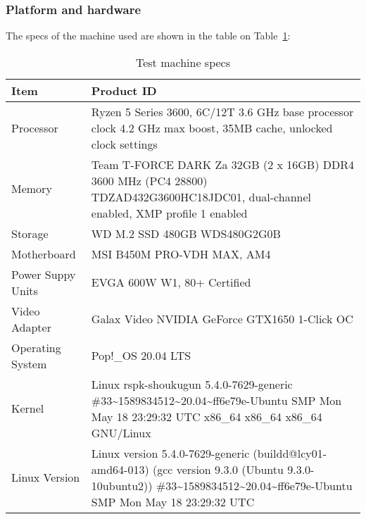 \subsubsection{Platform and hardware}
The specs of the machine used are shown in the table on Table~\ref{TABLE:SPECS}:\\

\begin{table}[!ht]
    \centering
    \begin{tabularx}{\linewidth}{|l|X|}
        \hline
        Item & Product ID \\
        \hline
        Processor  & Ryzen 5 Series 3600, 6C/12T 3.6 GHz base processor clock 4.2 GHz max boost, 35MB cache, unlocked clock settings \\
        \hline
        Memory  & Team T-FORCE DARK Za 32GB (2 x 16GB) DDR4 3600 MHz (PC4 28800) TDZAD432G3600HC18JDC01, dual-channel enabled, XMP profile 1 enabled\\
        \hline
        Storage  & WD M.2 SSD 480GB WDS480G2G0B \\
        \hline
        Motherboard  & MSI B450M PRO-VDH MAX, AM4 \\
        \hline
        Power Suppy Units  & EVGA 600W W1, 80+ Certified\\
        \hline
        Video Adapter  &  Galax Video NVIDIA GeForce GTX1650 1-Click OC  \\
        \hline
        Operating System  &  Pop!\_OS 20.04 LTS  \\
        \hline
        Kernel  &  Linux rspk-shoukugun 5.4.0-7629-generic \#33\~{}1589834512\~{}20.04\~{}ff6e79e-Ubuntu SMP Mon May 18 23:29:32 UTC  x86\_64 x86\_64 x86\_64 GNU/Linux\\
        \hline
        Linux Version  & Linux version 5.4.0-7629-generic (buildd@lcy01-amd64-013) (gcc version 9.3.0 (Ubuntu 9.3.0-10ubuntu2)) \#33\~{}1589834512\~{}20.04\~{}ff6e79e-Ubuntu SMP Mon May 18 23:29:32 UTC \\ 
        \hline
    \end{tabularx}    
    \caption{Test machine specs}
    \label{TABLE:SPECS}
\end{table}
\FloatBarrier